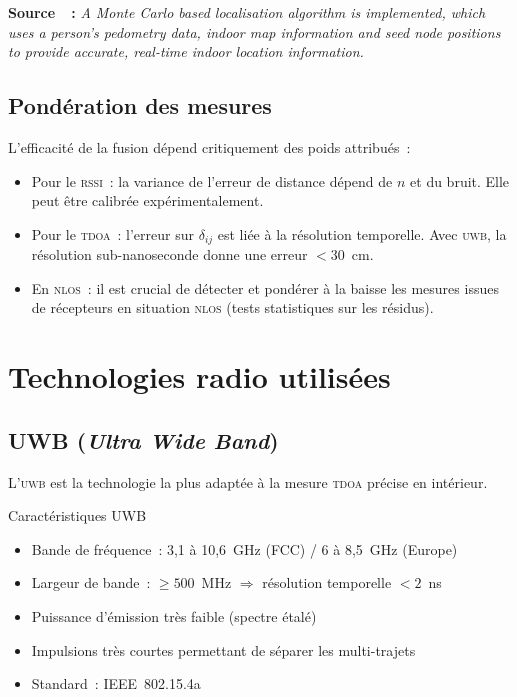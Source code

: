 \documentclass[12pt, a4paper]{article}
\newcommand{\TDOA}{\textsc{tdoa}}
\newcommand{\RSSI}{\textsc{rssi}}
\newcommand{\UWB}{\textsc{uwb}}
\newcommand{\NLOS}{\textsc{nlos}}
\begin{document}
\begin{citebox}
\textbf{Source~\cite{Klingbeil2008}~:} \og{}\textit{A Monte Carlo based
localisation algorithm is implemented, which uses a person's pedometry data, indoor
map information and seed node positions to provide accurate, real-time indoor
location information.}\fg{}
\end{citebox}

\subsection{Pondération des mesures}

L'efficacité de la fusion dépend critiquement des poids attribués~:

\begin{itemize}
  \item Pour le \RSSI{}~: la variance de l'erreur de distance dépend de $n$ et
        du bruit. Elle peut être calibrée expérimentalement.
  \item Pour le \TDOA{}~: l'erreur sur $\delta_{ij}$ est liée à la résolution
        temporelle. Avec \UWB{}, la résolution sub-nanoseconde donne une erreur
        $< 30$~cm.
  \item En \NLOS{}~: il est crucial de détecter et pondérer à la baisse les mesures
        issues de récepteurs en situation \NLOS{} (tests statistiques sur les résidus).
\end{itemize}

\section{Technologies radio utilisées}

\subsection{UWB (\textit{Ultra Wide Band})}

L'\UWB{} est la technologie la plus adaptée à la mesure \TDOA{} précise en
intérieur.

\begin{summarybox}{Caractéristiques UWB}
\begin{itemize}
  \item Bande de fréquence~: 3,1 à 10,6~GHz (FCC) / 6 à 8,5~GHz (Europe)
  \item Largeur de bande~: $\geq 500$~MHz $\Rightarrow$ résolution temporelle $< 2$~ns
  \item Puissance d'émission très faible (spectre étalé)
  \item Impulsions très courtes permettant de séparer les multi-trajets
  \item Standard~: IEEE~802.15.4a
\end{itemize}
\end{summarybox}
\end{document}
